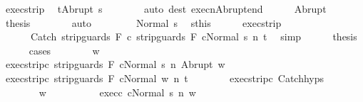 \begin{isabellebody}
\ exec{\isacharunderscore}strip\ \isamarkupfalse%
\ {\isachardoublequoteopen}t{\isacharequal}Abrupt\ s{\isacharprime}{\isachardoublequoteclose}\isanewline
\ \ \ \ \ \ \isamarkupfalse%
\ {\isacharparenleft}auto\ dest{\isacharcolon}\ execn{\isacharunderscore}Abrupt{\isacharunderscore}end{\isacharparenright}\isanewline
\ \ \ \ \isamarkupfalse%
\ Abrupt\ \isamarkupfalse%
\ {\isacharquery}thesis\isanewline
\ \ \ \ \ \ \isamarkupfalse%
\ auto\isanewline
\ \ \isamarkupfalse%
\isanewline
\ \ \ \ \isamarkupfalse%
\ {\isacharparenleft}Normal\ s{\isacharprime}{\isacharparenright}\ \isamarkupfalse%
\ s{\isacharequal}this\isanewline
\ \ \ \ \isamarkupfalse%
\ exec{\isacharunderscore}strip\ \isamarkupfalse%
\ \isanewline
\ \ \ \ \ \ {\isachardoublequoteopen}{\isasymGamma}{\isasymturnstile}{\isasymlangle}Catch\ {\isacharparenleft}strip{\isacharunderscore}guards\ F\ c{}{\isacharparenright}\ {\isacharparenleft}strip{\isacharunderscore}guards\ F\ c{}{\isacharparenright}{\isacharcomma}Normal\ s{\isacharprime}{\isasymrangle}\ {\isacharequal}n{\isasymRightarrow}\ t{\isachardoublequoteclose}\ \isamarkupfalse%
\ simp\isanewline
\ \ \ \ \isamarkupfalse%
\ {\isacharquery}thesis\isanewline
\ \ \ \ \isamarkupfalse%
\ {\isacharparenleft}cases{\isacharparenright}\isanewline
\ \ \ \ \ \ \isamarkupfalse%
\ w\isanewline
\ \ \ \ \ \ \isamarkupfalse%
\ exec{\isacharunderscore}strip{\isacharunderscore}c{}{\isacharcolon}\ {\isachardoublequoteopen}{\isasymGamma}{\isasymturnstile}{\isasymlangle}strip{\isacharunderscore}guards\ F\ c{}{\isacharcomma}Normal\ s{\isacharprime}{\isasymrangle}\ {\isacharequal}n{\isasymRightarrow}\ Abrupt\ w{\isachardoublequoteclose}\isanewline
\ \ \ \ \ \ \isamarkupfalse%
\ exec{\isacharunderscore}strip{\isacharunderscore}c{}{\isacharcolon}\ {\isachardoublequoteopen}{\isasymGamma}{\isasymturnstile}{\isasymlangle}strip{\isacharunderscore}guards\ F\ c{}{\isacharcomma}Normal\ w{\isasymrangle}\ {\isacharequal}n{\isasymRightarrow}\ t{\isachardoublequoteclose}\isanewline
\ \ \ \ \ \ \isamarkupfalse%
\ exec{\isacharunderscore}strip{\isacharunderscore}c{}\ Catch{\isachardot}hyps\ \isanewline
\ \ \ \ \ \ \isamarkupfalse%
\ w{\isacharprime}\ \ \isanewline
\ \ \ \ \ \ \ \ exec{\isacharunderscore}c{}{\isacharcolon}\ {\isachardoublequoteopen}{\isasymGamma}{\isasymturnstile}{\isasymlangle}c{}{\isacharcomma}Normal\ s{\isacharprime}{\isasymrangle}\ {\isacharequal}n{\isasymRightarrow}\ w{\isacharprime}{\isachardoublequoteclose}\ \isanewline

\end{isabellebody}
